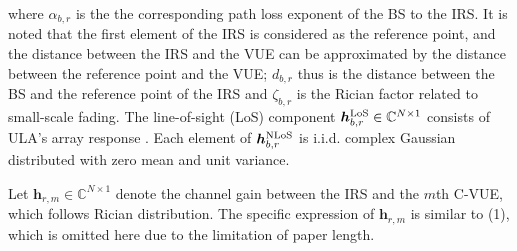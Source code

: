 \documentclass[journal]{IEEEtran}
\begin{document}
\noindent where ${\alpha _{b,r}}$ is the the corresponding path loss exponent of the BS to the IRS. It is noted that the first element of the IRS is considered as the reference point, and the distance between the IRS and the VUE can be approximated by the distance between the reference point and the VUE; ${d_{b,r}}$ thus is the distance between the BS and the reference point of the IRS and ${\zeta _{b,r}}$ is the Rician factor related to small-scale fading. The line-of-sight (LoS) component $\bm{h}_{b,r}^{{\rm{LoS}}} \in \mathbb{C}^{{N \times 1}}$ consists of ULA's array response \cite{IRS-10}. Each element of $\bm{h}_{b,r}^{{\rm{NLoS}}}$ is i.i.d. complex Gaussian distributed with zero mean and unit variance.




Let ${\bm{h}_{r,m}} \in \mathbb{C}^{{N \times 1}}$ denote the channel gain between the IRS and the $m$th C-VUE, which follows Rician distribution. The specific expression of ${\bm{h}_{r,m}}$ is similar to (1), which is omitted here due to the limitation of paper length.

\end{document}

